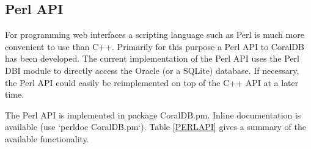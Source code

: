 \clearpage
\subsection{Perl API}



For programming web interfaces a scripting language such as Perl is much more convenient
to use than C++. Primarily for this purpose a Perl API to CoralDB has been developed. The current
implementation of the Perl API uses the Perl DBI module to directly access the Oracle (or a SQLite)
database. If necessary, the Perl API could easily be reimplemented on top of the C++ API at a later time.

The Perl API is implemented in package CoralDB.pm. Inline documentation is available (use `perldoc CoralDB.pm`).
Table \ref{PERLAPI} gives a summary of the available functionality.

